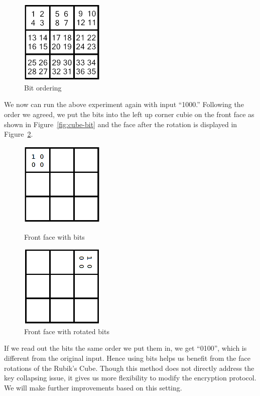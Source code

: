 \begin{figure}[ht]
    \centering
    \includegraphics[width=4cm]{figures/encryption/bit_order.png}
    \caption{Bit ordering}\label{fig:bit-order}
\end{figure}
We now can run the above experiment again with input ``1000.'' Following the order we agreed, we put the bits into the left up corner cubie on the front face as shown in Figure~\ref{fig:cube-bit} and the face after the rotation is displayed in Figure~\ref{fig:cube-bit-rotate}.
\begin{figure}[ht]
    \centering
    \begin{minipage}{0.49\textwidth}
        \centering
        \includegraphics[width=4cm]{figures/encryption/cube_face_bit.png}
        \caption{Front face with bits}\label{fig:cube-bit}
    \end{minipage}
    \begin{minipage}{0.49\textwidth}
        \centering
        \includegraphics[width=4cm]{figures/encryption/cube_face_bit_rotate.png}
        \caption{Front face with rotated bits}\label{fig:cube-bit-rotate}
    \end{minipage}
\end{figure}
If we read out the bits the same order we put them in, we get ``0100'', which is different from the original input. Hence using bits helps us benefit from the face rotations of the Rubik's Cube. Though this method does not directly address the key collapsing issue, it gives us more flexibility to modify the encryption protocol. We will make further improvements based on this setting.
